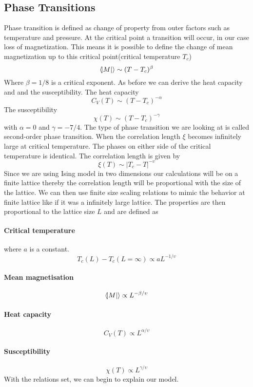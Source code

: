 \documentclass{article}
\begin{document}
\subsection{Phase Transitions}
Phase transition is defined as change of property from outer factors such as temperature and pressure. At  the critical point a transition will occur, in our case loss of magnetization. This means it is possible to define the change of mean magnetization up to this critical point(critical temperature $T_c$)
$$\langle \abs{M} \rangle\sim(T-T_c)^\beta$$
Where $\beta = 1/8$ is a critical exponent. As before we can derive the heat capacity and and the susceptibility.
\newline
\newline The heat capacity
$$C_V(T)\sim(T-T_c)^{-\alpha}$$
The susceptibility
$$\chi(T)\sim(T-T_c)^{-\gamma}$$
with $\alpha = 0$ and $\gamma = -7/4$.
\newline
\newline
The type of phase transition we are looking at is called second-order phase transition. When the correlation length $\xi$ becomes infinitely large at critical temperature. The phases on either side of the critical temperature is identical. The correlation length is given by
$$\xi(T)\sim |T_c-T|^{-\upsilon}$$
Since we are using Ising model in two dimensions our calculations will be on a finite lattice thereby the correlation length will be proportional with the size of the lattice.  We can then use finite size scaling relations to mimic the behavior at finite lattice like if it was a infinitely large lattice. The properties are then proportional to the lattice size $L$ and are defined as
\newline \newline
\paragraph{Critical temperature} where $a$ is a constant.
$$T_c(L)-T_c(L=\infty)\propto aL^{-1/\upsilon}$$
\paragraph{Mean magnetisation}
$$\langle \abs{M} \rangle\propto L^{-\beta/\upsilon}$$
\paragraph{Heat capacity}
$$C_V(T)\propto L^{\alpha/\upsilon}$$
\paragraph{Susceptibility}
$$\chi(T)\propto L^{\gamma/\upsilon}$$
\newline
\newline
With the relations set, we can begin to explain our model.
 
\end{document}
